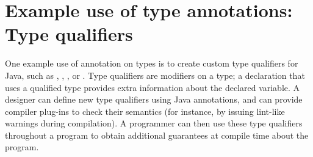 \documentclass[10pt]{article}
\begin{document}
% 



\section{Example use of type annotations:  Type qualifiers\label{type-qualifiers}}

One example use of annotation on types is to create custom type qualifiers
for Java,
such as , , , or .
Type qualifiers are modifiers on a type; a declaration that uses a
qualified type provides extra
information about the declared variable.
A designer can define new type
qualifiers using Java annotations, and can provide compiler plug-ins to check
their semantics (for instance, by issuing lint-like warnings during
compilation).
A programmer can then use these type qualifiers
throughout a program to obtain additional guarantees at compile time
about the program.
\end{document}
